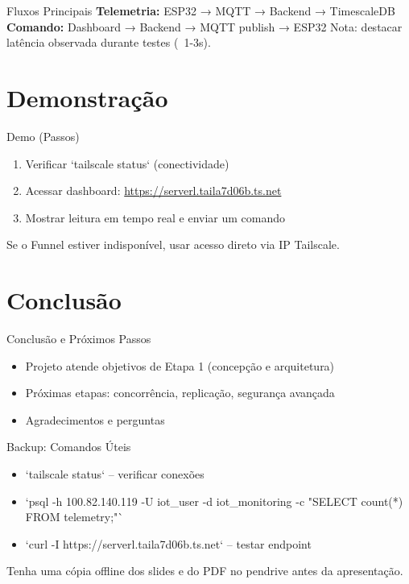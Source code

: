 \documentclass[11pt]{beamer}
\begin{document}
\begin{frame}{Fluxos Principais}
  \textbf{Telemetria:} ESP32 → MQTT → Backend → TimescaleDB
  \vspace{0.3cm}
  \textbf{Comando:} Dashboard → Backend → MQTT publish → ESP32
  \vfill\footnotesize{Nota: destacar latência observada durante testes (~1-3s).}
\end{frame}

\section{Demonstração}
\begin{frame}{Demo (Passos)}
  \begin{enumerate}
    \item Verificar `tailscale status` (conectividade)
    \item Acessar dashboard: \url{https://serverl.taila7d06b.ts.net}
    \item Mostrar leitura em tempo real e enviar um comando
  \end{enumerate}
  \vfill\footnotesize{Se o Funnel estiver indisponível, usar acesso direto via IP Tailscale.}
\end{frame}

\section{Conclusão}
\begin{frame}{Conclusão e Próximos Passos}
  \begin{itemize}
    \item Projeto atende objetivos de Etapa 1 (concepção e arquitetura)
    \item Próximas etapas: concorrência, replicação, segurança avançada
    \item Agradecimentos e perguntas
  \end{itemize}
\end{frame}

\begin{frame}{Backup: Comandos Úteis}
  \begin{itemize}
    \item `tailscale status` -- verificar conexões
    \item `psql -h 100.82.140.119 -U iot_user -d iot_monitoring -c "SELECT count(*) FROM telemetry;"`
    \item `curl -I https://serverl.taila7d06b.ts.net` -- testar endpoint
  \end{itemize}
  \vfill\footnotesize{Tenha uma cópia offline dos slides e do PDF no pendrive antes da apresentação.}
\end{frame}
\end{document}
